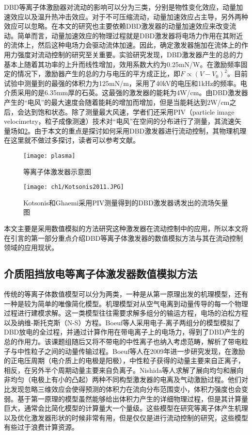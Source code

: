 DBD等离子体激励器对流动的影响可以分为三类，分别是物性变化效应，动量加速效应以及温升热冲击效应\cite{yu2017}。对于不可压缩流动，动量加速效应占主导，另外两种效应可以忽略。在本文的研究也主要依赖DBD激发器的动量加速效应来改变流动。简单而言，动量加速效应的物理过程就是DBD激发器将电场力作用在其附近的流体上，然后这种电场力会驱动流体加速。因此，确定激发器施加在流体上的作用力强度对流动控制的研究至关重要\cite{Enloe2004,Debien2012,Kriegseis2011,Hoskinson2010,Durscher2011}。实验研究发现，DBD激发器产生的总的力基本上随着其功率的上升而线性增加，效用系数大约为0.25mN/W\cite{Kriegseis2011}。在激励频率固定的情况下，激励器产生的总的力与电压的平方成正比\cite{Debien2012}，即$F\propto(V-V_0)^2$。目前试验中测量到的最强的体积力为125mN/m\cite{Thomas2009}，采用了40kV的电压和1kHz的频率。电介质采用的是6.35mm厚的石英。这最强的激发器的能耗为4W/cm。由DBD激发器产生的“电风”的最大速度会随着能耗的增加而增加，但是当能耗达到2W/cm之后，会达到饱和状态\cite{Jolibois2009}。除了测量最大风速，学者们还采用PIV（particle image velocimetry，粒子成像测速）技术对“电风”在空间的分布进行了测量\cite{Kotsonis2011,kriegseis2013velocity}，其流速矢量场如\ref{f:Kotsonis2011}。由于本文的重点是探讨如何采用DBD激发器进行流动控制，其物理机理在这里就不做过多探讨，读者可以参考文献\cite{Moreau2007,Benard2014}。

\begin{figure}
  \centering
  \texttt{[image: plasma]}
  \caption{等离子体激发器示意图\cite{Whalley2012}}\label{fig:SchematicPlasma}
\end{figure}
\begin{figure}
  \centering
  \texttt{[image: ch1/Kotsonis2011.JPG]}
  \caption{Kotsonis和Ghaemi\cite{Kotsonis2011}采用PIV测量得到的DBD激发器诱发出的流场矢量图}\label{f:Kotsonis2011}
\end{figure}
本文主要是采用数值模拟的方法研究这种激发器在流动控制中的应用，所以本文将在引言的第一部分重点介绍DBD等离子体激发器的数值模拟方法与其在流动控制领域的应用现状。


\subsection{介质阻挡放电等离子体激发器数值模拟方法}
传统的等离子体数值模型可以分为两类，一种是从第一原理出发的机理模型，还有一种是较为简单的唯像简化模型。机理模型对从空气电离到动量传导的每一个物理过程进行建模求解。这一类模型往往需要求解多组分的输运方程，电场的泊松方程以及纳维-斯托克斯（N-S）方程。Boeuf等人\cite{Boeuf2007}采用电子-离子两组分的模型模拟了DBD放电的全过程，并通过计算作用在带电离子上的电场力，得到了DBD产生的总的作用力。该课题组随后又将不带电的中性离子也纳入考虑范畴，解析了带电粒子与中性粒子之间的动量传输过程。Boeuf等人\cite{Boeuf2009}在2009年进一步研究发现，在激励的正电压周期（电介质上的电极是阳极），中性粒子获得的动量主要来自正离子，相反，在另外半个周期动量主要来自负离子。Nishida等人\cite{Nishida2016,Nishida2011}求解了展向均匀和展向非均匀（电极上有小的凸起）两种不同构型激发器的电离及气动激励过程。他们对比发现忽略三维效应会使得预测的体积力在流向分布范围变小，体积力强度也会变弱。基于第一原理的模型虽然能够给出体积力产生的详细物理过程，但是其计算量巨大，通常会比简化模型的计算量大一个量级。这些模型在研究等离子体产生机理以及优化激发器形状的时候非常有用，但是仅仅是进行流动控制的研究，这些模型有些过于浪费计算资源。

